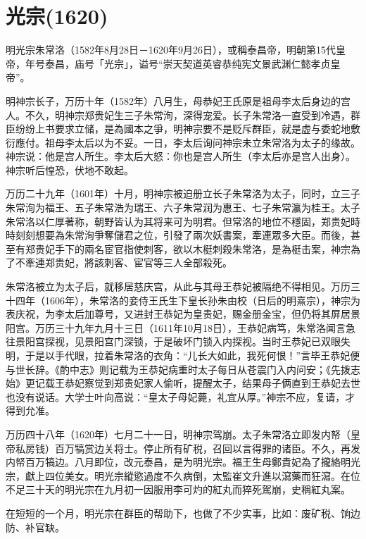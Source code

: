 
\section{光宗\tiny(1620)}

明光宗朱常洛（1582年8月28日－1620年9月26日），或稱泰昌帝，明朝第15代皇帝，年号泰昌，庙号「光宗」，谥号“崇天契道英睿恭纯宪文景武渊仁懿孝贞皇帝”。

明神宗长子，万历十年（1582年）八月生，母恭妃王氏原是祖母李太后身边的宫人。不久，明神宗郑贵妃生三子朱常洵，深得宠爱。长子朱常洛一直受到冷遇，群臣纷纷上书要求立储，是為國本之爭，明神宗要不是贬斥群臣，就是虚与委蛇地敷衍應付。祖母李太后以为不妥。一日，李太后询问神宗未立朱常洛为太子的缘故。神宗说：他是宫人所生。李太后大怒：你也是宫人所生（李太后亦是宫人出身）。神宗听后惶恐，伏地不敢起。

万历二十九年（1601年）十月，明神宗被迫册立长子朱常洛为太子，同时，立三子朱常洵为福王、五子朱常浩为瑞王、六子朱常润为惠王、七子朱常瀛为桂王。太子朱常洛以仁厚著称，朝野皆认为其将来可为明君。但常洛的地位不穩固，郑贵妃時時刻刻想要為朱常洵爭奪儲君之位，引發了兩次妖書案，牽連眾多大臣。而後，甚至有郑贵妃手下的兩名宦官指使刺客，欲以木梃刺殺朱常洛，是為梃击案，神宗為了不牽連郑贵妃，將該刺客、宦官等三人全部殺死。

朱常洛被立为太子后，就移居慈庆宫，从此与其母王恭妃被隔绝不得相见。万历三十四年（1606年），朱常洛的妾侍王氏生下皇长孙朱由校（日后的明熹宗），神宗为表庆祝，为李太后加尊号，又进封王恭妃为皇贵妃，赐金册金宝，但仍将其屏居景阳宫。万历三十九年九月十三日（1611年10月18日），王恭妃病笃，朱常洛闻言急往景阳宫探视，见景阳宫门深锁，于是破坏门锁入内探视。当时王恭妃已双眼失明，于是以手代眼，拉着朱常洛的衣角：“儿长大如此，我死何恨！”言毕王恭妃便与世长辞。《酌中志》则记载为王恭妃病重时太子每日从苍震门入内问安；《先拨志始》更记载王恭妃察觉到郑贵妃家人偷听，提醒太子，结果母子俩直到王恭妃去世也没有说话。大学士叶向高说：“皇太子母妃薨，礼宜从厚。”神宗不应，复请，才得到允准。

万历四十八年（1620年）七月二十一日，明神宗驾崩。太子朱常洛立即发内帑（皇帝私房钱）百万犒赏边关将士。停止所有矿税，召回以言得罪的诸臣。不久，再发内帑百万犒边。八月即位，改元泰昌，是为明光宗。福王生母鄭貴妃為了攏絡明光宗，獻上四位美女。明光宗縱慾過度不久病倒，太監崔文升進以瀉藥而狂瀉。在位不足三十天的明光宗在九月初一因服用李可灼的紅丸而猝死駕崩，史稱紅丸案。

在短短的一个月，明光宗在群臣的帮助下，也做了不少实事，比如：废矿税、饷边防、补官缺。

